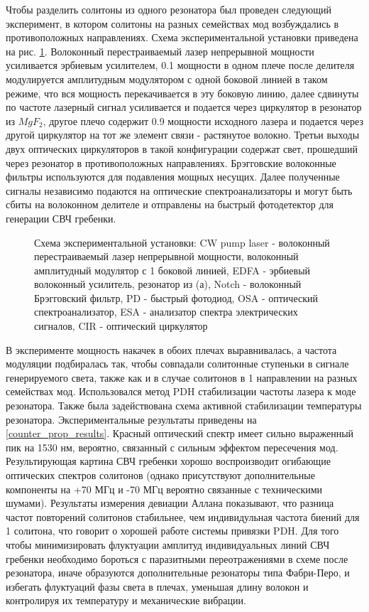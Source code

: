 Чтобы разделить солитоны из одного резонатора был проведен следующий эксперимент, в котором солитоны на разных семействах мод возбуждались в противоположных направлениях. Схема экспериментальной установки приведена на рис. \ref{Setup_CounterProp}. Волоконный перестраиваемый лазер непрерывной мощности усиливается эрбиевым усилителем, 0.1 мощности в одном плече после делителя модулируется амплитудным модулятором с одной боковой линией в таком режиме, что вся мощность перекачивается в эту боковую линию, далее сдвинуты по частоте лазерный сигнал усиливается и подается через циркулятор в резонатор из $MgF_2$, другое плечо содержит 0.9 мощности исходного лазера и подается через другой циркулятор на тот же элемент связи - растянутое волокно. Третьи выходы двух оптических циркуляторов в такой конфигурации содержат свет, прошедший через резонатор в противоположных направлениях. Брэгговские волоконные фильтры используются для подавления мощных несущих. Далее полученные сигналы независимо подаются на оптические спектроанализаторы и могут быть сбиты на волоконном делителе и отправлены на быстрый фотодетектор для генерации СВЧ гребенки.

\begin{figure}[ht]
\begin{minipage}[ht]{1\linewidth}
\end{minipage}
\caption{Схема экспериментальной установки: CW pump laser - волоконный перестраиваемый лазер непрерывной мощности, волоконный амплитудный модулятор с 1 боковой линией, EDFA - эрбиевый волоконный усилитель, резонатор из (а), Notch - волоконный Брэгговский фильтр, PD - быстрый фотодиод, OSA - оптический спектроанализатор, ESA - анализатор спектра электрических сигналов, CIR - оптический циркулятор}
\label{Setup_CounterProp}
\end{figure}

В эксперименте мощность накачек в обоих плечах выравнивалась, а частота модуляции подбиралась так, чтобы совпадали солитонные ступеньки в сигнале генерируемого света, также как и в случае солитонов в 1 направлении на разных семействах мод. Использовался метод PDH стабилизации частоты лазера к моде резонатора. Также была задействована схема активной стабилизации температуры резонатора. Экспериментальные результаты приведены на \ref{counter_prop_results}. Красный оптический спектр имеет сильно выраженный пик на 1530 нм, вероятно, связанный с сильным эффектом пересечения мод. Результирующая картина СВЧ гребенки хорошо воспроизводит огибающие оптических спектров солитонов (однако присутствуют дополнительные компоненты на +70 МГц и -70 МГц вероятно связанные с техническими шумами). Результаты измерения девиации Аллана показывают, что разница частот повторений солитонов стабильнее, чем индивидульная частота биений для 1 солитона, что говорит о хорошей работе системы привязки PDH. Для того чтобы минимизировать флуктуации амплитуд индивидуальных линий СВЧ гребенки необходимо бороться с паразитными переотражениями в схеме после резонатора, иначе образуются дополнительные резонаторы типа Фабри-Перо, и избегать флуктуаций фазы света в плечах, уменьшая длину волокон и контролируя их температуру и механические вибрации. 

